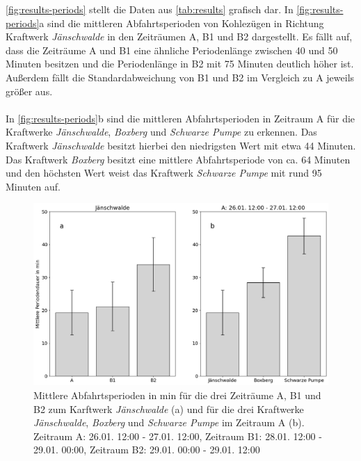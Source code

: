 \autoref{fig:results-periods} stellt die Daten aus \autoref{tab:results} grafisch dar. In \autoref{fig:results-periods}a sind die mittleren Abfahrtsperioden von Kohlezügen in Richtung Kraftwerk \emph{Jänschwalde} in den Zeiträumen A, B1 und B2 dargestellt. Es fällt auf, dass die Zeiträume A und B1 eine ähnliche Periodenlänge zwischen 40 und 50 Minuten besitzen und die Periodenlänge in B2 mit 75 Minuten deutlich höher ist. Außerdem fällt die Standardabweichung von B1 und B2 im Vergleich zu A jeweils größer aus.\\
\\
In \autoref{fig:results-periods}b sind die mittleren Abfahrtsperioden in Zeitraum A für die Kraftwerke \emph{Jänschwalde}, \emph{Boxberg} und \emph{Schwarze Pumpe} zu erkennen. Das Kraftwerk \emph{Jänschwalde} besitzt hierbei den niedrigsten Wert mit etwa 44 Minuten. Das Kraftwerk \emph{Boxberg} besitzt eine mittlere Abfahrtsperiode von ca. 64 Minuten und den höchsten Wert weist das Kraftwerk \emph{Schwarze Pumpe} mit rund 95 Minuten auf.

\begin{figure}[!ht]
	\centering
	\includegraphics[width=1.0\linewidth]{images/results/periods.png}
	\caption{Mittlere Abfahrtsperioden in min für die drei Zeiträume A, B1 und B2 zum Karftwerk \emph{Jänschwalde} (a) und für die drei Kraftwerke \emph{Jänschwalde}, \emph{Boxberg} und \emph{Schwarze Pumpe} im Zeitraum A (b). Zeitraum A: 26.01. 12:00 - 27.01. 12:00, Zeitraum B1: 28.01. 12:00 - 29.01. 00:00, Zeitraum B2: 29.01. 00:00 - 29.01. 12:00}
	\label{fig:results-periods}
\end{figure}


